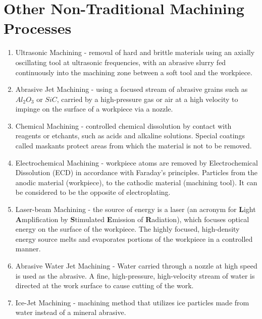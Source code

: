 \section{Other Non-Traditional Machining Processes}
\begin{enumerate}
\item Ultrasonic Machining - removal of hard and brittle materials using an axially oscillating tool at ultrasonic frequencies, with an abrasive slurry fed continuously into the machining zone between a soft tool and the workpiece.
\item Abrasive Jet Machining - using a focused stream of abrasive grains such as $Al_2O_3$ or $SiC$, carried by a high-pressure gas or air at a high velocity to impinge on the surface of a workpiece via a nozzle.
\item Chemical Machining - controlled chemical dissolution by contact with reagents or etchants, such as acids and alkaline solutions. Special coatings called maskants protect areas from which the material is not to be removed.
\item Electrochemical Machining - workpiece atoms are removed  by Electrochemical Dissolution (ECD) in accordance with Faraday's principles. Particles from the anodic material (workpiece), to the cathodic material (machining tool). It can be considered to be the opposite of electroplating.
\item Laser-beam Machining - the source of energy is a laser (an acronym for \textbf{L}ight \textbf{A}mplification by \textbf{S}timulated \textbf{E}mission of \textbf{R}adiation), which focuses optical energy on the surface of the workpiece. The highly focused, high-density energy source melts and evaporates portions of the workpiece in a controlled manner.
\item Abrasive Water Jet Machining - Water carried through a nozzle at high speed is used as the abrasive. A fine, high-pressure, high-velocity stream of water is directed at the work surface to cause cutting of the work.
\item Ice-Jet Machining - machining method that utilizes ice particles made from water instead of a mineral abrasive.
\end{enumerate}
